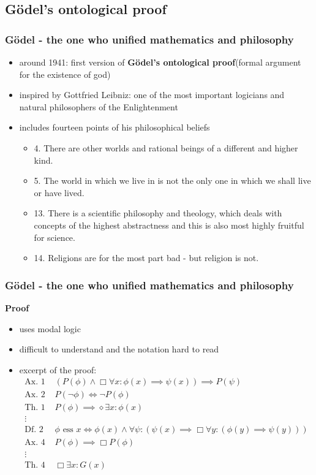 \subsection{Gödel's ontological proof}
\begin{frame}
    \frametitle{Gödel - the one who unified mathematics and philosophy}
    \begin{itemize}
        \item around 1941: first version of \textbf{Gödel's ontological proof}(formal argument for the existence of god)
        \pause \item inspired by Gottfried Leibniz: one of the most important logicians and natural philosophers of the Enlightenment
        \pause \item includes fourteen points of his philosophical beliefs
        \begin{itemize}
            \pause \item 4. There are other worlds and rational beings of a different and higher kind.
            \pause \item 5. The world in which we live in is not the only one in which we shall live or have lived.
            \pause \item 13. There is a scientific philosophy and theology, which deals with concepts of the highest abstractness and this is also most highly fruitful for science.
            \pause \item 14. Religions are for the most part bad - but religion is not.
        \end{itemize}
    \end{itemize}
\end{frame}

\begin{frame}
    \frametitle{Gödel - the one who unified mathematics and philosophy}
    \textbf{Proof}
    \begin{itemize}
        \item uses modal logic
        \item difficult to understand and the notation hard to read
        \item excerpt of the proof: 
        \small\begin{align*}
            \text{Ax. 1 }& (P(\phi) \wedge \Box \forall x : \phi(x) \implies \psi(x)) \implies P(\psi)
            \\ \text{Ax. 2 }& P(\neg\phi) \iff \neg P(\phi)
            \\ \text{Th. 1 }& P(\phi) \implies \diamond \exists x : \phi(x)
            \\ \vdots
            \\ \text{Df. 2 }& \phi \text{ ess } x \iff \phi(x) \wedge \forall \psi : (\psi(x) \implies \Box \forall y: (\phi(y) \implies \psi(y)))
            \\ \text{Ax. 4 }& P(\phi) \implies \Box P(\phi)
            \\ \vdots
            \\ \text{Th. 4 }& \Box \exists x : G(x)
        \end{align*}
    \end{itemize}

\end{frame}

